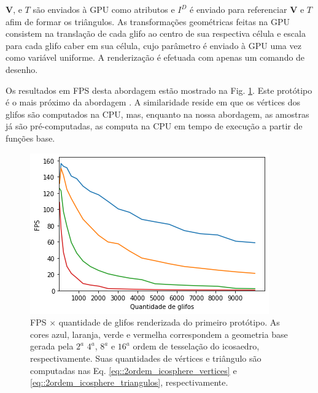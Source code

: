 \documentclass[
    12pt,                %
    oneside,            %
    a4paper,            %
    english,            %
    french,                %
    spanish,            %
    brazil                %
    ]{abntex2}
\begin{document}
$\mathbf{V}$, e $T$ são enviados à GPU como atributos e $I^D$ é enviado para referenciar $\mathbf{V}$ e $T$ afim de formar os triângulos. As transformações geométricas feitas na GPU consistem na translação de cada glifo ao centro de sua respectiva célula e escala para cada glifo caber em sua célula, cujo parâmetro é enviado à GPU uma vez como variável uniforme. A renderização é efetuada com apenas um comando de desenho.


Os resultados em FPS desta abordagem estão mostrado na Fig. \ref{fig::FPS_prototipo_1}. Este protótipo é o mais próximo da abordagem . A similaridade reside em que os vértices dos glifos são computados na CPU, mas, enquanto na nossa abordagem, as amostras já são pré-computadas,  as computa na CPU em tempo de execução a partir de funções base.%



\begin{figure}[htb]
    \centering
    \includegraphics[width=.65\linewidth, angle=0]{figs/Renderizacao_glifos_evolucao/FPS_prototipo1_Geral.png}
    \caption{FPS $\times$ quantidade de glifos renderizada do primeiro protótipo. As cores azul, laranja, verde e vermelha correspondem a geometria base gerada pela $2^{a}$ $4^{a}$, $8^{a}$ e $16^{a}$ ordem de tesselação do icosaedro, respectivamente. Suas quantidades de vértices e triângulo são computadas nas Eq. \ref{eq::2ordem_icosphere_vertices} e \ref{eq::2ordem_icosphere_triangulos}, respectivamente.}
    \label{fig::FPS_prototipo_1}
\end{figure}
\end{document}
